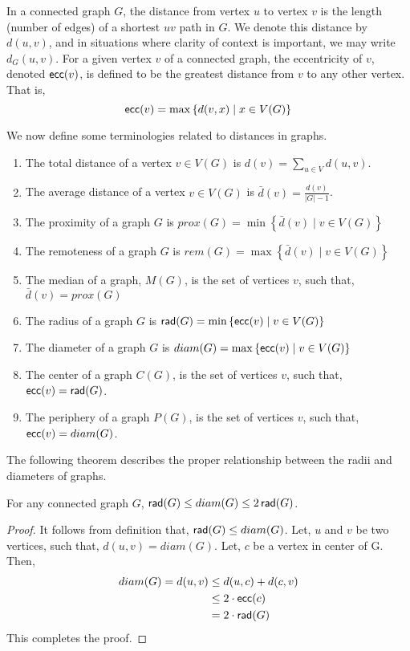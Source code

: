 \documentclass[../basic_graph_theory.tex]{subfiles}
\begin{document}
In a connected graph $G$, the distance from vertex $u$ to vertex $v$ is the length (number of edges) of a shortest $uv$ path in $G$. We denote this distance by $d(u,v)$, and in situations where clarity of context is important, we may write $d_G(u,v)$.
For a given vertex $v$ of a connected graph, the eccentricity of $v$, denoted $\operatorname{\mathsf{ecc}}(v)$, is defined to be the greatest distance from $v$ to any other vertex. That is,
\[
    \operatorname{\mathsf{ecc}}(v) = \max \left\{ d(v,x) \mid x \in V(G) \right\}
\]

We now define some terminologies related to distances in graphs.
\begin{enumerate}
    \item The total distance of a vertex $v \in V(G)$ is $d(v)=\sum_{u \in V} d(u,v)$.
    \item The average distance of a vertex $v \in V(G)$ is $\bar{d}(v)=\frac{d(v)}{|G|-1}$.
    \item The proximity of a graph $G$ is $prox(G) = \min \left\{\bar{d}(v) \mid v \in V(G) \right\}$
    \item The remoteness of a graph $G$ is $rem(G) = \max \left\{\bar{d}(v) \mid v \in V(G) \right\}$
    \item The median of a graph, $M(G)$, is the set of vertices $v$, such that, $\bar{d}(v)=prox(G)$
    \item The radius of a graph $G$ is $\operatorname{\mathsf{rad}}(G) = \min \left\{ \operatorname{\mathsf{ecc}}(v) \mid v \in V(G) \right\}$
    \item The diameter of a graph $G$ is $diam(G) = \max \left\{ \operatorname{\mathsf{ecc}}(v) \mid v \in V(G) \right\}$
    \item The center of a graph $C(G)$, is the set of vertices $v$, such that, $\operatorname{\mathsf{ecc}}(v)=\operatorname{\mathsf{rad}}(G)$.
    \item The periphery of a graph $P(G)$, is the set of vertices $v$, such that, $\operatorname{\mathsf{ecc}}(v)=diam(G)$.
\end{enumerate}

The following theorem describes the proper relationship between the radii and
diameters of graphs.

\begin{Thm}{}{}
    For any connected graph $G$, $\operatorname{\mathsf{rad}}(G) \le diam(G) \le 2\operatorname{\mathsf{rad}}(G)$.
\end{Thm}
\begin{proof}
    It follows from definition that, $\operatorname{\mathsf{rad}}(G) \le diam(G)$. Let, $u$ and $v$ be two vertices, such that, $d(u,v)=diam(G)$. Let, $c$ be a vertex in center of G. Then,
    \begin{align*}
        diam(G) = d(u,v)
         & \le d(u,c)+d(c,v)  \\
         & \le 2\cdot \operatorname{\mathsf{ecc}}(c) \\
         & = 2\cdot \operatorname{\mathsf{rad}}(G)
    \end{align*}
    This completes the proof.
\end{proof}
\end{document}
